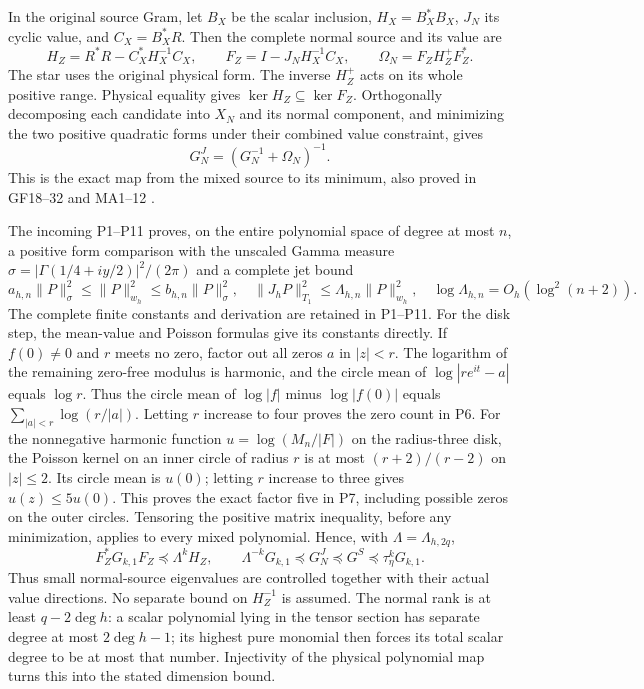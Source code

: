 \documentclass[11pt]{article}
\begin{document}
In the original source Gram, let $B_X$ be the scalar inclusion,
$H_X=B_X^*B_X$, $J_N$ its cyclic value, and $C_X=B_X^*R$.
Then the complete normal source and its value are
\[
 H_Z=R^*R-C_X^*H_X^{-1}C_X,\qquad
 F_Z=I-J_NH_X^{-1}C_X,\qquad
 \Omega_N=F_ZH_Z^+F_Z^*.
 \tag{JM2}
\]
The star uses the original physical form. The inverse $H_Z^+$ acts on
its whole positive range. Physical equality gives
$\ker H_Z\subseteq\ker F_Z$. Orthogonally decomposing each candidate
into $X_N$ and its normal component, and minimizing the two positive
quadratic forms under their combined value constraint, gives
\[
 G_N^J=(G_N^{-1}+\Omega_N)^{-1}.\tag{JM3}
\]
This is the exact map from the mixed source to its minimum, also proved
in GF18--32 and MA1--12 \cite{GF,MA}.

The incoming P1--P11 proves, on the entire polynomial space of degree
at most $n$, a positive form comparison with the unscaled Gamma
measure $\sigma=|\Gamma(1/4+iy/2)|^2/(2\pi)$ and a complete jet bound
\[
 a_{h,n}\|P\|_\sigma^2\le\|P\|_{w_h}^2\le b_{h,n}\|P\|_\sigma^2,
 \quad \|J_hP\|_{T_1}^2\le\Lambda_{h,n}\|P\|_{w_h}^2,
 \quad\log\Lambda_{h,n}=O_h(\log^2(n+2)).\tag{JM4}
\]
The complete finite constants and derivation are retained in P1--P11.
For the disk step, the mean-value and Poisson formulas
\cite{Complex} give its constants directly. If $f(0)\ne0$ and
$r$ meets no zero, factor out all zeros $a$ in $|z|<r$.
The logarithm of the remaining zero-free modulus is harmonic, and
the circle mean of $\log|re^{it}-a|$ equals $\log r$.
Thus the circle mean of $\log|f|$ minus $\log|f(0)|$ equals
$\sum_{|a|<r}\log(r/|a|)$. Letting $r$ increase to four proves
the zero count in P6. For the nonnegative harmonic function
$u=\log(M_n/|F|)$ on the radius-three disk, the Poisson kernel on
an inner circle of radius $r$ is at most $(r+2)/(r-2)$ on
$|z|\le2$. Its circle mean is $u(0)$; letting $r$ increase to
three gives $u(z)\le5u(0)$. This proves the exact factor five
in P7, including possible zeros on the outer circles.
Tensoring the positive matrix inequality, before any minimization,
applies to every mixed polynomial. Hence, with $\Lambda=\Lambda_{h,2q}$,
\[
 F_Z^*G_{k,1}F_Z\preceq\Lambda^kH_Z,\qquad
 \Lambda^{-k}G_{k,1}\preceq G_N^J
 \preceq G^S\preceq\tau_\eta^kG_{k,1}.\tag{JM5}
\]
Thus small normal-source eigenvalues are controlled together with
their actual value directions. No separate bound on $H_Z^{-1}$ is
assumed. The normal rank is at least $q-2\deg h$: a scalar polynomial
lying in the tensor section has separate degree at most $2\deg h-1$;
its highest pure monomial then forces its total scalar degree to be
at most that number. Injectivity of the physical polynomial map
turns this into the stated dimension bound.
\end{document}
